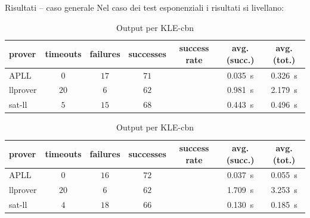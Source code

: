 \documentclass{beamer}
\begin{document}
\begin{frame}{Risultati -- caso generale}
	Nel caso dei test esponenziali i risultati si livellano:
	\begin{table}[h!]
		\begin{subtable}{\textwidth}
			\centering
			{\footnotesize
			\begin{tabular}{ | l c c c c c c | }
				\hline
				\textbf{prover} & \textbf{timeouts} & \textbf{failures} & \textbf{successes} & \textbf{success rate} & \textbf{avg. (succ.)} & \textbf{avg. (tot.)} \\
				\hline
				\hline
				APLL     & $0$  & $17$ & $71$ & \color{darkbluestatale}{$\approx 0.80$} & \qty{0.035}{\second} & \qty{0.326}{\second} \\
				llprover & $20$ & $6$  & $62$ & \color{darkbluestatale}{$\approx 0.70$} & \qty{0.981}{\second} & \qty{2.179}{\second} \\
				sat-ll   & $5$  & $15$ & $68$ & \color{darkbluestatale}{$\approx 0.77$} & \qty{0.443}{\second} & \qty{0.496}{\second} \\
				\hline
			\end{tabular}
			}
			\caption{Output per KLE-cbv}
			\label{table:KLE-cbv}
		\end{subtable}
		\begin{subtable}{\textwidth}
			\centering
			{\footnotesize
			\begin{tabular}{ | l c c c c c c | }
				\hline
				\textbf{prover} & \textbf{timeouts} & \textbf{failures} & \textbf{successes} & \textbf{success rate} & \textbf{avg. (succ.)} & \textbf{avg. (tot.)} \\
				\hline
				\hline
				APLL     & $0$  & $16$ & $72$ & \color{darkbluestatale}{$\approx 0.80$} & \qty{0.037}{\second} & \qty{0.055}{\second} \\
				llprover & $20$ & $6$  & $62$ & \color{darkbluestatale}{$\approx 0.70$} & \qty{1.709}{\second} & \qty{3.253}{\second} \\
				sat-ll   & $4$  & $18$ & $66$ & \color{darkbluestatale}{$\approx 0.75$} & \qty{0.130}{\second} & \qty{0.185}{\second} \\
				\hline
			\end{tabular}
			}
			\caption{Output per KLE-cbn}
			\label{table:KLE-cbn}
		\end{subtable}
	\end{table}
\end{frame}


\backmatter[notitle]

\end{document}
